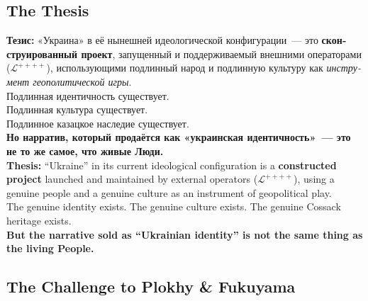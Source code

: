 \documentclass[11pt,a4paper]{article}
\theoremstyle{definition}
\theoremstyle{remark}
\newcommand{\LondonOp}{\mathcal{L}^{++++}}  %
\begin{document}
\subsection{The Thesis}
\label{sec:ukraine-thesis}

\begin{manifestobox}
\foreignlanguage{russian}{
\textbf{Тезис:} «Украина» в её нынешней идеологической конфигурации~---
это \textbf{сконструированный проект}, запущенный и поддерживаемый
внешними операторами ($\LondonOp$), использующими подлинный народ
и подлинную культуру как \textit{инструмент геополитической игры}.\\[0.2cm]
Подлинная идентичность существует.\\
Подлинная культура существует.\\
Подлинное казацкое наследие существует.\\[0.2cm]
\textbf{Но нарратив, который продаётся как «украинская идентичность»~---
это не то же самое, что живые Люди.}
}\\[0.3cm]
\textbf{Thesis:} ``Ukraine'' in its current ideological configuration
is a \textbf{constructed project} launched and maintained by external
operators ($\LondonOp$), using a genuine people and a genuine culture
as an instrument of geopolitical play.\\[0.2cm]
The genuine identity exists. The genuine culture exists.
The genuine Cossack heritage exists.\\[0.2cm]
\textbf{But the narrative sold as ``Ukrainian identity''
is not the same thing as the living People.}
\end{manifestobox}

\subsection{The Challenge to Plokhy \& Fukuyama}
\label{sec:plokhy-fukuyama}
\end{document}
